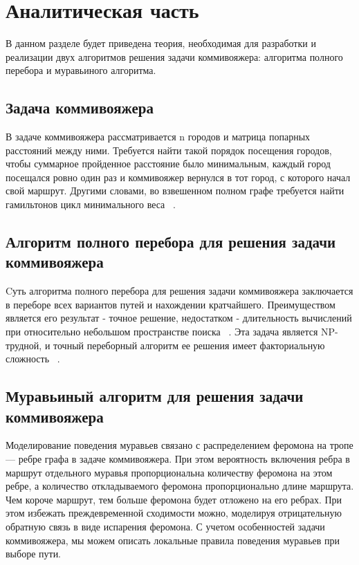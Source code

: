 \chapter{Аналитическая часть}

В данном разделе будет приведена теория, необходимая для разработки и реализации двух алгоритмов решения задачи коммивояжера: алгоритма полного перебора и муравьиного алгоритма.

\section{Задача коммивояжера}

В задаче коммивояжера рассматривается n городов  и матрица попарных расстояний между ними. Требуется найти такой порядок  посещения  городов,  чтобы  суммарное  пройденное  расстояние было минимальным, каждый город посещался ровно один раз и  коммивояжер  вернулся  в  тот  город,  с  которого  начал  свой  маршрут.  Другими  словами,  во  взвешенном  полном  графе  требуется найти гамильтонов цикл минимального веса ~\cite{second_article}. 

\section{Алгоритм полного перебора для решения задачи коммивояжера}

Cуть алгоритма полного перебора для решения задачи коммивояжера заключается в переборе всех вариантов путей и нахождении кратчайшего. Преимуществом является его результат - точное решение, недостатком - длительность вычислений при относительно небольшом пространстве поиска ~\cite{third_article}. Эта задача является NP-трудной, и точный переборный алгоритм ее решения имеет факториальную сложность ~\cite{first_article}.


\section{Муравьиный алгоритм для решения задачи коммивояжера}

Моделирование поведения муравьев связано с распределением феромона на тропе — ребре графа в задаче коммивояжера. При этом вероятность включения ребра в маршрут отдельного муравья пропорциональна количеству феромона на этом ребре, а количество откладываемого феромона пропорционально длине маршрута. Чем короче маршрут, тем больше феромона будет отложено на его ребрах. При этом избежать преждевременной сходимости можно, моделируя отрицательную обратную связь в виде испарения феромона. С учетом особенностей задачи коммивояжера, мы можем описать локальные правила поведения муравьев при выборе пути.

